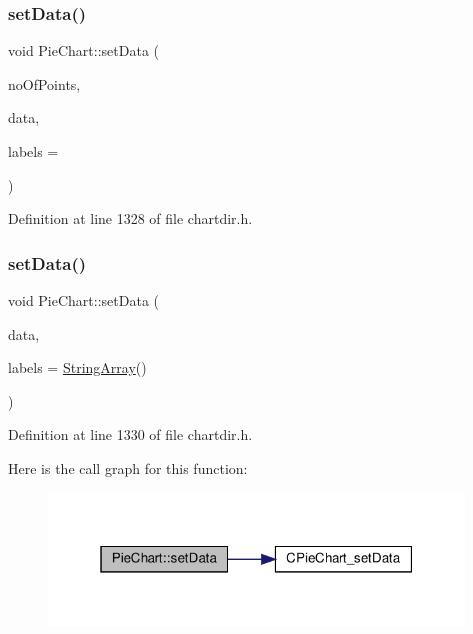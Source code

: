 \subsubsection{\texorpdfstring{set\+Data()}{setData()}\hspace{0.1cm}{\footnotesize\ttfamily [1/2]}}
{\footnotesize\ttfamily void Pie\+Chart\+::set\+Data (\begin{DoxyParamCaption}\item[{int}]{no\+Of\+Points,  }\item[{const double $\ast$}]{data,  }\item[{const char $\ast$const $\ast$}]{labels = {} }\end{DoxyParamCaption})\hspace{0.3cm}{\ttfamily [inline]}}



Definition at line 1328 of file chartdir.\+h.

\mbox{\label{class_pie_chart_ae79f9956e6e0f80469d9c750c2bceb7d}} 
\subsubsection{\texorpdfstring{set\+Data()}{setData()}\hspace{0.1cm}{\footnotesize\ttfamily [2/2]}}
{\footnotesize\ttfamily void Pie\+Chart\+::set\+Data (\begin{DoxyParamCaption}\item[{\hyperlink{class_double_array}{Double\+Array}}]{data,  }\item[{\hyperlink{class_string_array}{String\+Array}}]{labels = {\ttfamily \hyperlink{class_string_array}{String\+Array}()} }\end{DoxyParamCaption})\hspace{0.3cm}{\ttfamily [inline]}}



Definition at line 1330 of file chartdir.\+h.

Here is the call graph for this function\+:
\nopagebreak
\begin{figure}[H]
\begin{center}
\leavevmode
\includegraphics[width=313pt]{class_pie_chart_ae79f9956e6e0f80469d9c750c2bceb7d_cgraph}
\end{center}
\end{figure}
\mbox{\label{class_pie_chart_a142e2140586f2462f74a4eaf9ee6739c}} 
